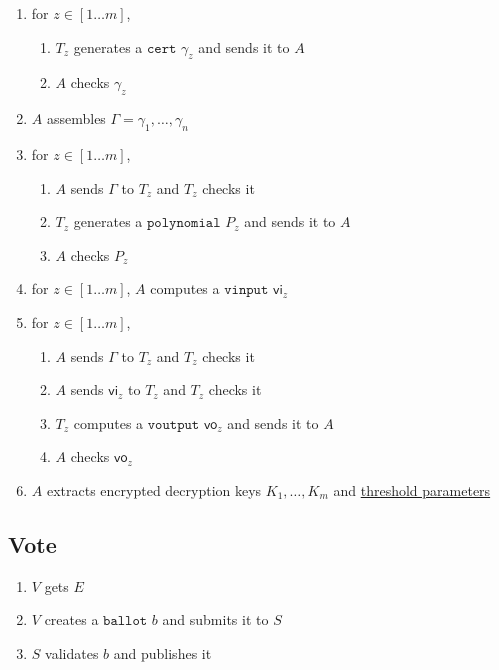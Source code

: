 \documentclass[a4paper]{article}
\newcommand{\ballot}{\texttt{ballot}}
\newcommand{\cert}{\texttt{cert}}
\newcommand{\poly}{\texttt{polynomial}}
\newcommand{\vinput}{\texttt{vinput}}
\newcommand{\voutput}{\texttt{voutput}}
\begin{document}
\begin{enumerate}
\item for $z\in[1\dots m]$,
  \begin{enumerate}
  \item $T_z$ generates a \hyperref[certificates]{$\cert$} $\gamma_z$
    and sends it to $A$
  \item $A$ checks $\gamma_z$
  \end{enumerate}
\item $A$ assembles $\Gamma=\gamma_1,\dotsc,\gamma_n$
\item for $z\in[1\dots m]$,
  \begin{enumerate}
  \item $A$ sends $\Gamma$ to $T_z$ and $T_z$ checks it
  \item $T_z$ generates a \hyperref[polynomials]{$\poly$} $P_z$ and
    sends it to $A$
  \item $A$ checks $P_z$
  \end{enumerate}
\item for $z\in[1\dots m]$, $A$ computes a
  \hyperref[vinputs]{$\vinput$} $\textsf{vi}_z$
\item for $z\in[1\dots m]$,
  \begin{enumerate}
  \item $A$ sends $\Gamma$ to $T_z$ and $T_z$ checks it
  \item $A$ sends $\textsf{vi}_z$ to $T_z$ and $T_z$ checks it
  \item $T_z$ computes a \hyperref[voutputs]{$\voutput$} $\textsf{vo}_z$ and
    sends it to $A$
  \item $A$ checks $\textsf{vo}_z$
  \end{enumerate}
\item $A$ extracts encrypted decryption keys $K_1,\dots,K_m$ and
  \hyperref[threshold-params]{threshold parameters}
\end{enumerate}

\subsection{Vote}

\begin{enumerate}
\item $V$ gets $E$
\item $V$ creates a \hyperref[ballots]{$\ballot$} $b$ and submits it to $S$
\item $S$ validates $b$ and publishes it
\end{enumerate}
\end{document}
